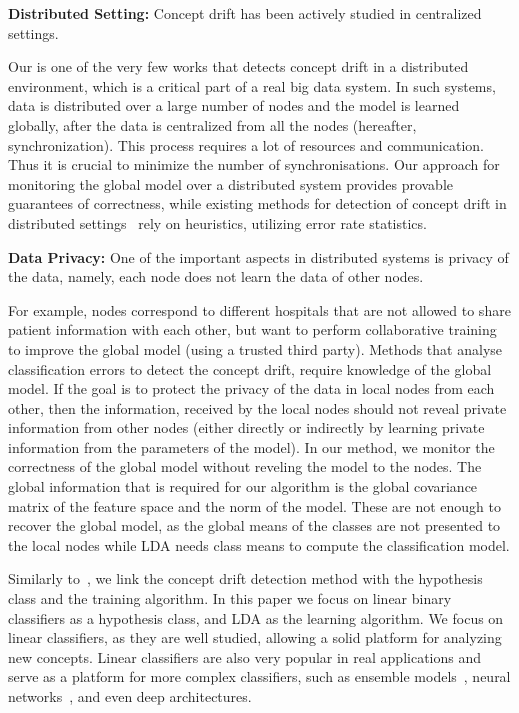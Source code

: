 \documentclass{sig-alternate-05-2015}
\begin{document}
\noindent \textbf{Distributed Setting:} Concept drift has been actively studied in centralized settings.

    Our is one of the very few works \cite{AngGZPH13} that detects concept drift in a distributed
    environment, which is a critical part of a real big data system.
    In such systems, data is distributed over a large number of nodes and the model is learned
    globally, after the data is centralized from all the nodes (hereafter, synchronization).
    This process requires a lot of resources and communication.
    Thus it is crucial to minimize the number of synchronisations.
    Our approach for monitoring the global model over a distributed system
    provides provable guarantees of correctness, while existing methods for detection of concept
    drift in distributed settings~\cite{AngGZPH13} rely on heuristics, utilizing error rate statistics.

\noindent \textbf{Data Privacy:} One of the important aspects in distributed systems is privacy of the data,    namely, each node does not learn the data of other nodes.


    For example, nodes correspond to different hospitals that are not allowed
    to share patient information with each other, but want to perform
    collaborative training to improve the global model (using a trusted third party).
    Methods that analyse classification errors to detect the concept drift,
    require knowledge of the global model. If the goal is to protect the
    privacy of the data in local nodes from each other, then the information,
    received by the local nodes should not reveal private information from other
    nodes (either directly or indirectly by learning private information from the
    parameters of the model).
    In our method, we monitor the correctness of the global model without
    reveling the model to the nodes. The global information that is required
    for our algorithm is the global covariance matrix of the feature space
    and the norm of the model. These are not enough to recover the global model,
    as the global means of the classes are not presented to the local nodes
    while LDA needs class means to compute the classification model.



Similarly to~\cite{icml2014c2_harel14}, we link the concept drift detection method with the
hypothesis class and the training algorithm.
In this paper we focus on linear binary classifiers as a hypothesis class, and
LDA \cite{fisher1936use} as the learning algorithm.
We focus on linear classifiers, as they are well studied, allowing a solid platform for analyzing new concepts. Linear classifiers are also very popular in real applications and serve as a platform for more complex classifiers, such as ensemble models~\cite{Deva, eSVM},
neural networks~\cite{osadchy2015k}, and even deep architectures\cite{ROSS}.
\end{document}

